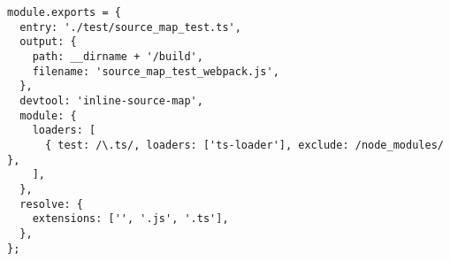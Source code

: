 \begin{verbatim}
module.exports = {
  entry: './test/source_map_test.ts',
  output: {
    path: __dirname + '/build',
    filename: 'source_map_test_webpack.js',
  },
  devtool: 'inline-source-map',
  module: {
    loaders: [
      { test: /\.ts/, loaders: ['ts-loader'], exclude: /node_modules/ },
    ],
  },
  resolve: {
    extensions: ['', '.js', '.ts'],
  },
};
\end{verbatim}
